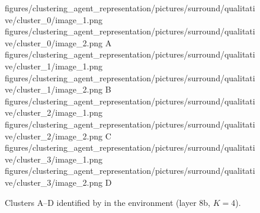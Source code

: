 \begin{figure}[H]
    \qualitativeClusterFigureSetup
    \qualitativeClusterTwo
        {figures/clustering_agent_representation/pictures/surround/qualitative/cluster_0/image_1.png}
        {figures/clustering_agent_representation/pictures/surround/qualitative/cluster_0/image_2.png}
        {A}
    \qualitativeClusterTwo
        {figures/clustering_agent_representation/pictures/surround/qualitative/cluster_1/image_1.png}
        {figures/clustering_agent_representation/pictures/surround/qualitative/cluster_1/image_2.png}
        {B}
    \qualitativeClusterTwo
        {figures/clustering_agent_representation/pictures/surround/qualitative/cluster_2/image_1.png}
        {figures/clustering_agent_representation/pictures/surround/qualitative/cluster_2/image_2.png}
        {C}
    \qualitativeClusterTwo
        {figures/clustering_agent_representation/pictures/surround/qualitative/cluster_3/image_1.png}
        {figures/clustering_agent_representation/pictures/surround/qualitative/cluster_3/image_2.png}
        {D}
    \caption{Clusters A--D identified by  in the \SurroundName environment (layer 8b, $K=4$).}
    \label{fig:qualitative_surround}
\end{figure}
